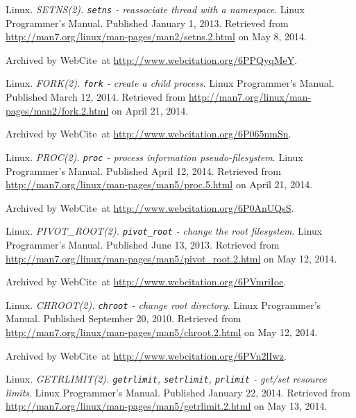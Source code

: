 \begin{thebibliography}{9}
Linux. \emph{SETNS(2). \texttt{setns} - reassociate thread with a namespace}.
Linux Programmer's Manual. Published January 1, 2013.  Retrieved from
\url{http://man7.org/linux/man-pages/man2/setns.2.html} on May 8, 2014.

Archived by WebCite\textsuperscript{\textregistered}\ at
\url{http://www.webcitation.org/6PPQyqMeY}.


Linux. \emph{FORK(2). \texttt{fork} - create a child process}. Linux
Programmer's Manual. Published March 12, 2014. Retrieved from
\url{http://man7.org/linux/man-pages/man2/fork.2.html} on April 21, 2014.

Archived by WebCite\textsuperscript{\textregistered}\ at
\url{http://www.webcitation.org/6P065nmSn}.


Linux. \emph{PROC(2). \texttt{proc} - process information pseudo-filesystem}.
Linux Programmer's Manual. Published April 12, 2014. Retrieved from
\url{http://man7.org/linux/man-pages/man5/proc.5.html} on April 21, 2014.

Archived by WebCite\textsuperscript{\textregistered}\ at
\url{http://www.webcitation.org/6P0AnUQsS}.


Linux. \emph{PIVOT\_ROOT(2). \texttt{pivot\_root} - change the root
filesystem}.  Linux Programmer's Manual. Published June 13, 2013. Retrieved
from \url{http://man7.org/linux/man-pages/man5/pivot_root.2.html} on May 12,
2014.

Archived by WebCite\textsuperscript{\textregistered}\ at
\url{http://www.webcitation.org/6PVmriIoe}.


Linux. \emph{CHROOT(2). \texttt{chroot} - change root directory}.  Linux
Programmer's Manual. Published September 20, 2010. Retrieved from
\url{http://man7.org/linux/man-pages/man5/chroot.2.html} on May 12, 2014.

Archived by WebCite\textsuperscript{\textregistered}\ at
\url{http://www.webcitation.org/6PVn2lIwz}.


Linux. \emph{GETRLIMIT(2). \texttt{getrlimit}, \texttt{setrlimit},
\texttt{prlimit} - get/set resource limits}.  Linux Programmer's Manual.
Published January 22, 2014. Retrieved from
\url{http://man7.org/linux/man-pages/man5/getrlimit.2.html} on May 13, 2014.


\end{thebibliography}

